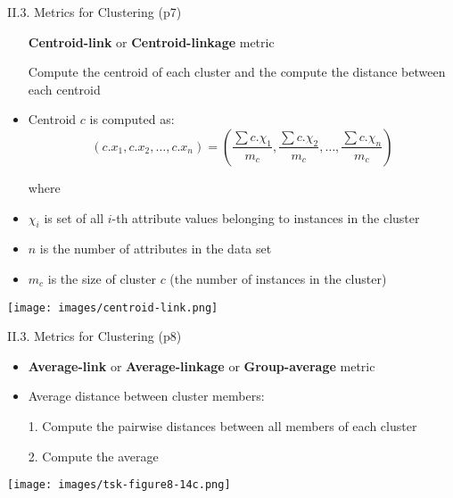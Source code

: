 \documentclass[handout]{beamer}
\newcommand{\stronger}[1]{\textbf{\color{purple} #1}}
\begin{document}
\begin{frame}{II.3. Metrics for Clustering (p7)}
\begin{itemize}
\item[] \stronger{Centroid-link} or \stronger{Centroid-linkage} metric
\item[] Compute the centroid of each cluster and the compute the distance between each centroid
\item Centroid $c$ is computed as:
\[
(c.x_1,c.x_2,\ldots,c.x_n) = ( \frac{\sum{c.\chi_1}}{m_c}, \frac{\sum{c.\chi_2}}{m_c}, \ldots, \frac{\sum{c.\chi_n}}{m_c} )
\]
\item[] where
\item $\chi_i$ is set of all $i$-th attribute values belonging to instances in the cluster
\item $n$ is the number of attributes in the data set
\item $m_c$ is the size of cluster $c$ (the number of instances in the cluster)
\end{itemize}
\begin{center}
\texttt{[image: images/centroid-link.png]}
\end{center}
\end{frame}
\begin{frame}{II.3. Metrics for Clustering (p8)}
\begin{itemize}
\item \stronger{Average-link} or \stronger{Average-linkage} or \stronger{Group-average} metric
\item Average distance between cluster members:
\item[1.] Compute the pairwise distances between all members of each cluster
\item[2.] Compute the average
\end{itemize}
\begin{center}
\texttt{[image: images/tsk-figure8-14c.png]} \\
\cite[Figure 8.14c]{tan-et-al:2005}
\end{center}
\end{frame}
\end{document}
